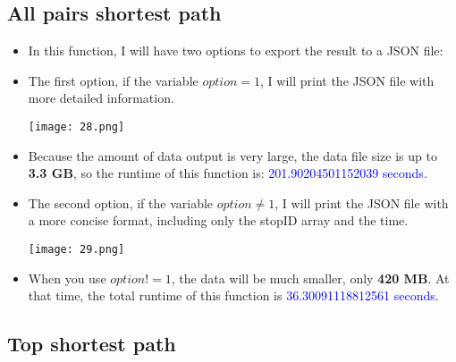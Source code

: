 \documentclass[12pt]{scrartcl}
\begin{document}
\newpage

\subsection{All pairs shortest path}

\begin{itemize}
\item In this function, I will have two options to export the result to a JSON file:
\item The first option, if the variable $option = 1$, I will print the JSON file with more detailed information.
\begin{center}
\texttt{[image: 28.png]}
\end{center}

\item Because the amount of data output is very large, the data file size is up to \textbf{3.3 GB}, so the runtime of this function is: \textcolor{blue}{201.90204501152039 seconds}.

\newpage
\item The second option, if the variable $option \neq 1$, I will print the JSON file with a more concise format, including only the stopID array and the time.
\begin{center}
\texttt{[image: 29.png]}
\end{center}
\item When you use $option != 1$, the data will be much smaller, only \textbf{420 MB}. At that time, the total runtime of this function is \textcolor{blue}{36.30091118812561 seconds}.
\end{itemize}

\subsection{Top shortest path}
\end{document}
